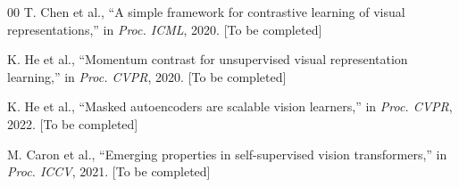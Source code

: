 \documentclass[journal,twoside,web]{ieeecolor}
\begin{document}
\begin{thebibliography}{00}
T. Chen et al., ``A simple framework for contrastive learning of visual representations,'' in \emph{Proc. ICML}, 2020. [To be completed]

K. He et al., ``Momentum contrast for unsupervised visual representation learning,'' in \emph{Proc. CVPR}, 2020. [To be completed]

K. He et al., ``Masked autoencoders are scalable vision learners,'' in \emph{Proc. CVPR}, 2022. [To be completed]

M. Caron et al., ``Emerging properties in self-supervised vision transformers,'' in \emph{Proc. ICCV}, 2021. [To be completed]

\end{thebibliography}

\end{document}
